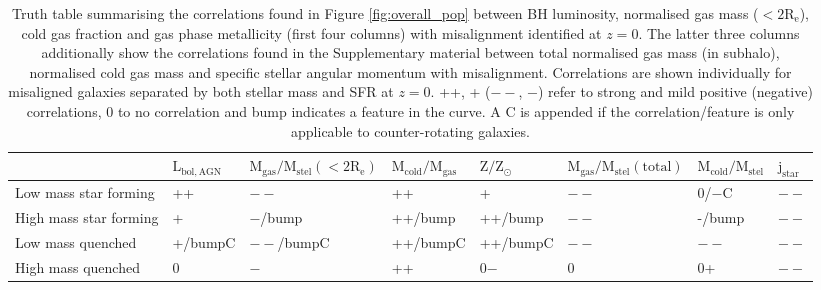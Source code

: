 \begin{table}
\centering
\begin{tabular}{llllllll}
\hline
&  $\mathrm{L_{bol,AGN}}$ & $\mathrm{M_{gas} / M_{stel} (< 2R_e)}$ & $\mathrm{M_{cold} / M_{gas}}$ & $\mathrm{Z / Z_{\odot}}$ & $\mathrm{M_{gas}/M_{stel} (total)}$ & $\mathrm{M_{cold}/M_{stel}}$ & $\mathrm{j_{star}}$ \\
\hline
Low mass star forming & ++ & $--$ & ++ & + & $--$ & 0/$-$C & $--$ \\
High mass star forming & + & $-$/bump & ++/bump & ++/bump & $--$ & -/bump & $--$ \\
Low mass quenched & +/bumpC & $--$/bumpC & ++/bumpC & ++/bumpC & $--$ & $--$ & $--$ \\
High mass quenched & 0 & $-$ & ++ & 0$-$ & 0 & 0+ & $--$ \\
\end{tabular}
\caption{Truth table summarising the correlations found in Figure \ref{fig:overall_pop} between BH luminosity, normalised gas mass ($\mathrm{< 2R_e}$), cold gas fraction and gas phase metallicity (first four columns) with misalignment identified at $z=0$. The latter three columns additionally show the correlations found in the Supplementary material between total normalised gas mass (in subhalo), normalised cold gas mass and specific stellar angular momentum with misalignment. Correlations are shown individually for misaligned galaxies separated by both stellar mass and SFR at $z=0$. ++, + ($--$, $-$) refer to strong and mild positive (negative) correlations, 0 to no correlation and bump indicates a feature in the curve. A C is appended if the correlation/feature is only applicable to counter-rotating galaxies.}
\label{tab:truth}
\end{table}

